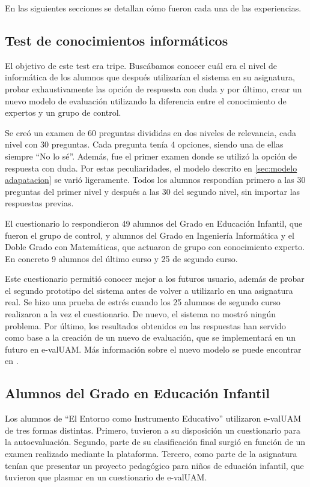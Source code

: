 En las siguientes secciones se detallan cómo fueron cada una de las experiencias.

\subsection{Test de conocimientos informáticos}

El objetivo de este test era tripe. Buscábamos conocer cuál era el nivel de informática de los alumnos que después utilizarían el sistema en su asignatura, probar exhaustivamente las opción de respuesta con duda y por último, crear un nuevo modelo de evaluación utilizando la diferencia entre el conocimiento de expertos y un grupo de control.

Se creó un examen de 60 preguntas divididas en dos niveles de relevancia, cada nivel con 30 preguntas. Cada pregunta tenía 4 opciones, siendo una de ellas siempre ``No lo sé''. Además, fue el primer examen donde se utilizó la opción de respuesta con duda. Por estas peculiaridades, el modelo descrito en \ref{sec:modelo adapatacion} se varió ligeramente. Todos los alumnos respondían primero a las 30 preguntas del primer nivel y después a las 30 del segundo nivel, sin importar las respuestas previas.

El cuestionario lo respondieron 49 alumnos del Grado en Educación Infantil, que fueron el grupo de control, y alumnos del Grado en Ingeniería Informática y el Doble Grado con Matemáticas, que actuaron de grupo con conocimiento experto. En concreto 9 alumnos del último curso y 25 de segundo curso.

Este cuestionario permitió conocer mejor a los futuros usuario, además de probar el segundo prototipo del sistema antes de volver a utilizarlo en una asignatura real. Se hizo una prueba de estrés cuando los 25 alumnos de segundo curso realizaron a la vez el cuestionario. De nuevo, el sistema no mostró ningún problema. Por último, los resultados obtenidos en las respuestas han servido como base a la creación de un nuevo de evaluación, que se implementará en un futuro en e-valUAM. Más información sobre el nuevo modelo se puede encontrar en \cite{Molins15}.

\subsection{Alumnos del Grado en Educación Infantil}

Los alumnos de ``El Entorno como Instrumento Educativo'' utilizaron e-valUAM de tres formas distintas. Primero, tuvieron a su disposición un cuestionario para la autoevaluación. Segundo, parte de su clasificación final surgió en función de un examen realizado mediante la plataforma. Tercero, como parte de la asignatura tenían que presentar un proyecto pedagógico para niños de eduación infantil, que tuvieron que plasmar en un cuestionario de e-valUAM. 

